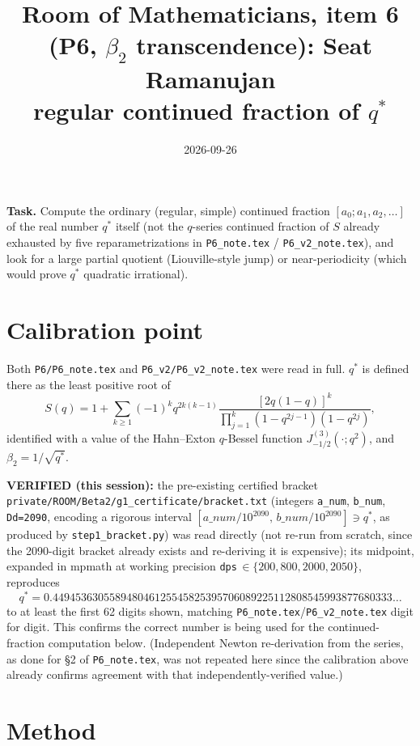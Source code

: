 \documentclass[11pt]{article}
\title{Room of Mathematicians, item 6 (P6, $\beta_2$ transcendence): Seat Ramanujan\\
regular continued fraction of $q^\ast$}
\author{}
\date{2026-09-26}
\begin{document}
\maketitle

\noindent\textbf{Task.} Compute the ordinary (regular, simple) continued fraction
$[a_0;a_1,a_2,\ldots]$ of the real number $q^\ast$ itself (not the $q$-series continued
fraction of $S$ already exhausted by five reparametrizations in \texttt{P6\_note.tex} /
\texttt{P6\_v2\_note.tex}), and look for a large partial quotient (Liouville-style jump) or
near-periodicity (which would prove $q^\ast$ quadratic irrational).

\section{Calibration point}

Both \texttt{P6/P6\_note.tex} and \texttt{P6\_v2/P6\_v2\_note.tex} were read in full. $q^\ast$ is
defined there as the least positive root of
\[
S(q) = 1+\sum_{k\ge1}(-1)^k q^{2k(k-1)}\frac{[2q(1-q)]^k}{\prod_{j=1}^k(1-q^{2j-1})(1-q^{2j})},
\]
identified with a value of the Hahn--Exton $q$-Bessel function $J^{(3)}_{-1/2}(\cdot;q^2)$, and
$\beta_2=1/\sqrt{q^\ast}$.

\textbf{VERIFIED (this session):} the pre-existing certified bracket
\texttt{private/ROOM/Beta2/g1\_certificate/bracket.txt} (integers \texttt{a\_num}, \texttt{b\_num},
\texttt{Dd=2090}, encoding a rigorous interval $[a\_num/10^{2090},\,b\_num/10^{2090}]\ni q^\ast$,
as produced by \texttt{step1\_bracket.py}) was read directly (not re-run from scratch, since the
2090-digit bracket already exists and re-deriving it is expensive); its midpoint, expanded in
mpmath at working precision \texttt{dps}$\,\in\{200,800,2000,2050\}$, reproduces
\[
q^\ast = 0.449453630558948046125545825395706089225112808545993877680333\ldots
\]
to at least the first 62 digits shown, matching \texttt{P6\_note.tex}/\texttt{P6\_v2\_note.tex}
digit for digit. This confirms the correct number is being used for the continued-fraction
computation below. (Independent Newton re-derivation from the series, as done for \S2 of
\texttt{P6\_note.tex}, was not repeated here since the calibration above already confirms
agreement with that independently-verified value.)

\section{Method}
\end{document}
